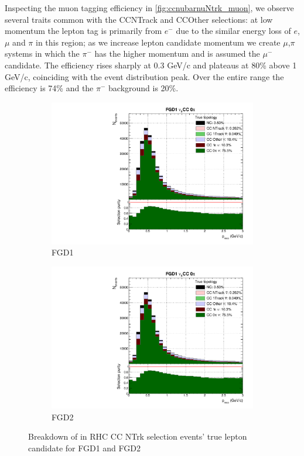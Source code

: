Inspecting the muon tagging efficiency in \autoref{fig:ccnubarnuNtrk_muon}, we observe several traits common with the \numubar CCNTrack and \numu CCOther selections: at low momentum the lepton tag is primarily from $e^-$ due to the similar energy loss of $e$, $\mu$ and $\pi$ in this region; as we increase lepton candidate momentum we create $\mu$,$\pi$ systems in which the $\pi^-$ has the higher momentum and is assumed the $\mu^-$ candidate. The efficiency rises sharply at 0.3 GeV/c and plateaus at 80\% above 1 GeV/c, coinciding with the event distribution peak. Over the entire range the efficiency is 74\% and the $\pi^-$ background is 20\%.
\begin{figure}[!h]
	\begin{subfigure}[t]{0.49\textwidth}
		\includegraphics[width=\textwidth,page=24, trim={0mm 0mm 0mm 9mm}, clip]{figures/mach3/selection/2017b_Diag_WithSelection}
		\caption{FGD1}
	\end{subfigure}
	\begin{subfigure}[t]{0.49\textwidth}
		\includegraphics[width=\textwidth,page=28, trim={0mm 0mm 0mm 9mm}, clip]{figures/mach3/selection/2017b_Diag_WithSelection}
		\caption{FGD2}
	\end{subfigure}
	\caption{Breakdown of \numu in RHC CC NTrk selection events' true lepton candidate for FGD1 and FGD2 }
	\label{fig:ccnubarnuNtrk_muon}
\end{figure}

